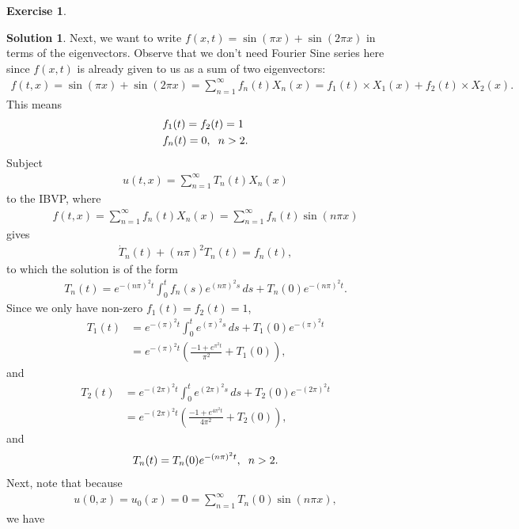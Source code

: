 \documentclass{article}
\theoremstyle{definition}
\newtheorem*{exer*}{Exercise}
\newtheorem*{sln*}{Solution}
\begin{document}
\begin{exer*}
\begin{sln*}
		Next, we want to write $f(x,t) = \sin(\pi x) + \sin(2\pi x)$ in terms of the eigenvectors. Observe that we don't need Fourier Sine series here since $f(x,t)$ is already given to us as a sum of two eigenvectors:
		\begin{align*}
		f(t,x) = \sin(\pi x) + \sin(2\pi x) = \sum^\infty_{n=1}f_n(t)X_n(x) = f_1(t) \times X_1(x) + f_2(t) \times X_2(x).
		\end{align*}
		This means
		\begin{align*}
		&f_1(t) = f_2(t) = 1\\
		&f_n(t) = 0, \hspace{0.2cm}n > 2.
		\end{align*}
		Subject 
		\begin{align*}
		u(t,x) = \sum^\infty_{n=1} T_n(t)X_n(x)
		\end{align*}
		to the IBVP, where
		\begin{align*}
		f(t,x) = \sum^\infty_{n=1}f_n(t)X_n(x) = \sum^\infty_{n=1}f_n(t)\sin(n\pi x)
		\end{align*}
		gives
		\begin{align*}
		\dot{T}_n(t) + (n\pi)^2T_n(t) = f_n(t),
		\end{align*}
		to which the solution is of the form
		\begin{align*}
		T_n(t) = e^{-(n\pi)^2t}\int^t_0 f_n(s)e^{(n\pi)^2s}\,ds + T_n(0)e^{-(n\pi)^2t}.
		\end{align*}
		Since we only have non-zero $f_1(t) = f_2(t) = 1$, 
		\begin{align*}
		T_1(t) &= e^{-(\pi)^2t}\int^t_0 e^{(\pi)^2s}\,ds + T_1(0)e^{-(\pi)^2t}\\
		&= e^{-(\pi)^2t}\left(\frac{-1 + e^{\pi^2t}}{\pi^2}  + T_1(0)\right),
		\end{align*}
		and 
		\begin{align*}
		T_2(t) &= e^{-(2\pi)^2t}\int^t_0 e^{(2\pi)^2s}\,ds + T_2(0)e^{-(2\pi)^2t}\\
		&= e^{-(2\pi)^2t}\left(\frac{-1 + e^{4\pi^2t}}{4\pi^2}  + T_2(0)  \right),
		\end{align*}
		and
		\begin{align*}
		T_n(t) = T_n(0)e^{-(n\pi)^2t}, \hspace{0.2cm}n > 2.
		\end{align*}
		Next, note that because 
		\begin{align*}
		u(0,x) = u_0(x) = 0 = \sum^\infty_{n=1}T_n(0)\sin(n\pi x),
		\end{align*}
		we have
		\begin{align*}

\end{align*}
\end{sln*}
\end{exer*}
\end{document}
